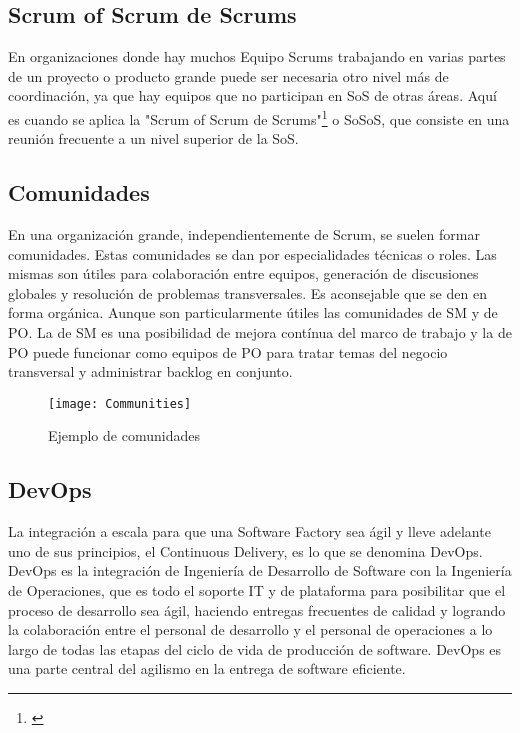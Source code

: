 \subsection{Scrum of Scrum de Scrums}

En organizaciones donde hay muchos Equipo Scrums trabajando en varias partes de un proyecto o producto grande puede ser necesaria otro nivel más de coordinación, ya que hay equipos que no participan en SoS de otras áreas. Aquí es cuando se aplica la "Scrum of Scrum de Scrums"\footnote{\cite{SBOK-2013}} o SoSoS, que consiste en una reunión frecuente a un nivel superior de la SoS.

\subsection{Comunidades}

En una organización grande, independientemente de Scrum, se suelen formar comunidades. Estas comunidades se dan por especialidades técnicas o roles. Las mismas son útiles para colaboración entre equipos, generación de discusiones globales y resolución de problemas transversales. Es aconsejable que se den en forma orgánica. Aunque son particularmente útiles las comunidades de SM y de PO. La de SM es una posibilidad de mejora contínua del marco de trabajo y la de PO puede funcionar como equipos de PO para tratar temas del negocio transversal y administrar backlog en conjunto.

\begin{figure}[h]
  \centering
  \texttt{[image: Communities]}
  \caption{Ejemplo de comunidades}
  \centering
  \label{fig:Communities} %
\end{figure}


\subsection{DevOps}


La integración a escala para que una Software Factory sea ágil y lleve adelante uno de sus principios, el Continuous Delivery, es lo que se denomina DevOps. DevOps es la integración de Ingeniería de Desarrollo de Software con la Ingeniería de Operaciones, que es todo el soporte IT y de plataforma para posibilitar que el proceso de desarrollo sea ágil, haciendo entregas frecuentes de calidad y logrando la colaboración entre el personal de desarrollo y el personal de operaciones a lo largo de todas las etapas del ciclo de vida de producción de software. DevOps es una parte central del agilismo en la entrega de software eficiente.

